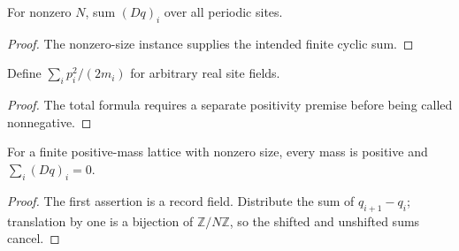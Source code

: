 \begin{definition}
\label{def:finite-periodic:total-forward-difference}
For nonzero $N$, sum $(Dq)_i$ over all periodic sites.
\end{definition}
\begin{proof}The nonzero-size instance supplies the intended finite cyclic sum.\end{proof}

\begin{definition}
\label{def:finite-periodic:kinetic}
Define $\sum_ip_i^2/(2m_i)$ for arbitrary real site fields.
\end{definition}
\begin{proof}The total formula requires a separate positivity premise before being called nonnegative.\end{proof}

\begin{theorem}
\label{thm:physics:finite_periodic:target}
For a finite positive-mass lattice with nonzero size, every mass is positive and $\sum_i(Dq)_i=0$.
\end{theorem}
\begin{proof}
The first assertion is a record field. Distribute the sum of $q_{i+1}-q_i$; translation by one is a bijection of $\mathbb Z/N\mathbb Z$, so the shifted and unshifted sums cancel.
\end{proof}
